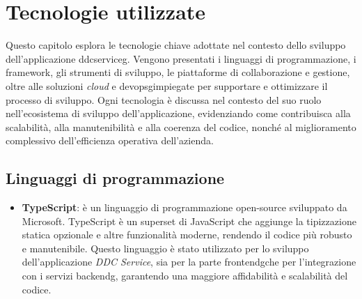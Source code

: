\chapter{Tecnologie utilizzate}
\label{chap:tecnologie_utilizzate}
Questo capitolo esplora le tecnologie chiave adottate nel contesto dello sviluppo dell'applicazione \gls{ddcserviceg}\glox.
Vengono presentati i linguaggi di programmazione, i framework, gli strumenti di sviluppo, le piattaforme di collaborazione e gestione, oltre alle soluzioni \textit{cloud} e \gls{devopsg}\glox impiegate per supportare e ottimizzare il processo di sviluppo.
Ogni tecnologia è discussa nel contesto del suo ruolo nell'ecosistema di sviluppo dell'applicazione, evidenziando come contribuisca alla scalabilità, alla manutenibilità e alla coerenza del codice, nonché al miglioramento complessivo dell'efficienza operativa dell'azienda.
\section{Linguaggi di programmazione}
\begin{itemize}
    \item \textbf{TypeScript}: è un linguaggio di programmazione open-source sviluppato da Microsoft.
    TypeScript è un superset di JavaScript che aggiunge la tipizzazione statica opzionale e altre funzionalità moderne, rendendo il codice più robusto e manutenibile. 
    Questo linguaggio è stato utilizzato per lo sviluppo dell'applicazione \textit{DDC Service}, sia per la parte \gls{frontendg}\glox che per l'integrazione con i servizi \gls{backendg}\glox, garantendo una maggiore affidabilità e scalabilità del codice.
\end{itemize}

